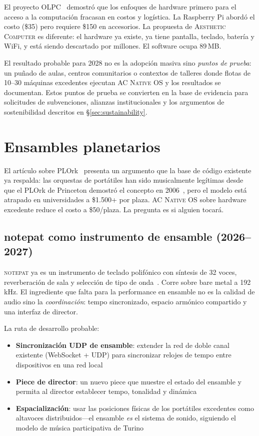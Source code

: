 \documentclass[10pt,letterpaper,twocolumn]{article}
\newcommand{\ac}{\textsc{Aesthetic Computer}}
\newcommand{\acos}{\textsc{AC Native OS}}
\newcommand{\np}{\textsc{notepat}}
\begin{document}
El proyecto OLPC~\citep{kraemer2009olpc} demostró que los enfoques de hardware primero para el acceso a la computación fracasan en costos y logística. La Raspberry Pi abordó el costo (\$35) pero requiere \$150 en accesorios. La propuesta de \ac{} es diferente: el hardware ya existe, ya tiene pantalla, teclado, batería y WiFi, y está siendo descartado por millones. El software ocupa 89\,MB.

El resultado probable para 2028 no es la adopción masiva sino \emph{puntos de prueba}: un puñado de aulas, centros comunitarios o contextos de talleres donde flotas de 10--30 máquinas excedentes ejecutan \acos{} y los resultados se documentan. Estos puntos de prueba se convierten en la base de evidencia para solicitudes de subvenciones, alianzas institucionales y los argumentos de sostenibilidad descritos en \S\ref{sec:sustainability}.


\section{Ensambles planetarios}
\label{sec:ensembles}

El artículo sobre PLOrk~\citep{scudder2026plork} presenta un argumento que la base de código existente ya respalda: las orquestas de portátiles han sido musicalmente legítimas desde que el PLOrk de Princeton demostró el concepto en 2006~\citep{trueman2006plork}, pero el modelo está atrapado en universidades a \$1.500+ por plaza. \acos{} sobre hardware excedente reduce el costo a \$50/plaza. La pregunta es si alguien tocará.

\subsection{notepat como instrumento de ensamble (2026--2027)}

\np{} ya es un instrumento de teclado polifónico con síntesis de 32 voces, reverberación de sala y selección de tipo de onda~\citep{scudder2026notepat}. Corre sobre bare metal a 192\,kHz. El ingrediente que falta para la performance en ensamble no es la calidad de audio sino la \emph{coordinación}: tempo sincronizado, espacio armónico compartido y una interfaz de director.

La ruta de desarrollo probable:

\begin{itemize}
  \item \textbf{Sincronización UDP de ensamble}: extender la red de doble canal existente (WebSocket + UDP) para sincronizar relojes de tempo entre dispositivos en una red local
  \item \textbf{Piece de director}: un nuevo piece que muestre el estado del ensamble y permita al director establecer tempo, tonalidad y dinámica
  \item \textbf{Espacialización}: usar las posiciones físicas de los portátiles excedentes como altavoces distribuidos---el ensamble \emph{es} el sistema de sonido, siguiendo el modelo de música participativa de Turino~\citep{turino2008music}
\end{itemize}
\end{document}
